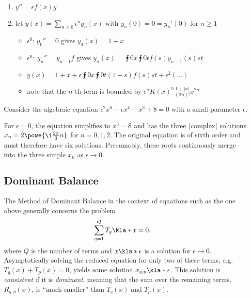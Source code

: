 \documentclass[english, parskip=full]{scrartcl}
\newcommand{\example}[3]{\begin{tcolorbox}[colback=colorbackgroundexample,colframe=colorexample, breakable,enhanced,title={\textbf{#1}: #2.}]#3\end{tcolorbox}}
\begin{document}
\example{ODE}{$y'' = f(x)y$ with $y(0)=1$ and $y'(0)=1$}{\begin{enumerate}
\item $y''=\epsilon f(x)y$
\item let $y(x) = \sum_{n\ge 0} \epsilon^n y_n(x)$ with $y_n(0)=0=y_n'(0)$ for $n\ge 1$
\begin{itemize}
\item $\epsilon^0$: $y_0''=0$ gives $y_0(x)=1+x$
\item $\epsilon^n$: $y_n''=y_{n-1} f$ gives $y_n(x) = \intx{0}{x}{\intx{0}{t}{f(s)y_{n-1}(s)}{s}}{t}$
\item $y(x) = 1 + x + \epsilon\intx{0}{x}{\intx{0}{t}{(1+s)f(s)}{s}}{t} + \epsilon^2 (\dots)$
\item note that the $n$-th term is bounded by $\epsilon^n K(x)^n \frac{1+|x|}{(2n)!} x^{2n}$
\end{itemize}
\end{enumerate}}

Consider the algebraic equation $\epsilon^2 x^6 - \epsilon x^4 - x^3 + 8 = 0$ with a small parameter $\epsilon$.

For $\epsilon=0$, the equation simplifies to $x^3=8$ and has the three (complex) solutions $x_n = 2 \powe{\i \frac{2\pi}{3} n}$ for $n=0,1,2$.
The original equation is of sixth order and must therefore have six solutions.
Presumably, these roots continuously merge into the three simple $x_n$ as $\epsilon\rightarrow 0$.

\subsection{Dominant Balance}
The Method of Dominant Balance in the context of equations such as the one above generally concerns the problem
\begin{align}
\sum_{q=1}^Q T_q\kla*{x} &= 0,
\end{align}
where $Q$ is the number of terms and $x\kla*{\epsilon}$ is a solution for $\epsilon\rightarrow 0$.
Asymptotically solving the reduced equation for only two of these terms, e.g. $T_q(x) + T_p(x) = 0$, yields some solution $x_{q,p}\kla*{\epsilon}$.
This solution is \emph{consistent} if it is \emph{dominant}, meaning that the sum over the remaining terms, $R_{q,p}(x)$, is ``much smaller'' than $T_q(x)$ and $T_p(x)$.
\end{document}
